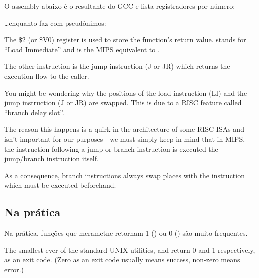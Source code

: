 O assembly abaixo é o resultante do GCC e lista registradores por número:



\dots enquanto \IDA faz com pseudônimos:



The \$2 (or \$V0) register is used to store the function's return value.
 stands for ``Load Immediate'' and is the MIPS equivalent to \MOV.

The other instruction is the jump instruction (J or JR) which returns the execution flow to the \gls{caller}.

You might be wondering why the positions of the load instruction (LI) and the jump instruction (J or JR) are swapped. This is due to a \ac{RISC} feature called ``branch delay slot''.

The reason this happens is a quirk in the architecture of some RISC \ac{ISA}s and isn't important for our
purposes---we must simply keep in mind that in MIPS, the instruction following a jump or branch instruction
is executed  the jump/branch instruction itself.

As a consequence, branch instructions always swap places with the instruction which must be executed beforehand.

\subsection{Na prática}

Na prática, funções que merametne retornam 1 () ou 0 () são muito frequentes.

The smallest ever of the standard UNIX utilities,  and  return 0 and 1 respectively, as an exit code.
(Zero as an exit code usually means success, non-zero means error.)

